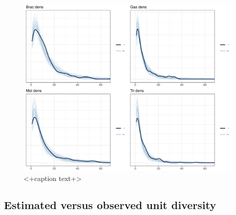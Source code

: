 \documentclass[12pt,letterpaper]{article}
\begin{document}
\begin{figure}[ht]
  \centering
  \includegraphics[width=\textwidth,height=0.5\textheight,keepaspectratio=true]{figure/ppc_dens_zoom}
  \caption{<+caption text+>}
  \label{fig:<+label+>}
\end{figure}








\subsection{Estimated versus observed unit diversity}
\end{document}
